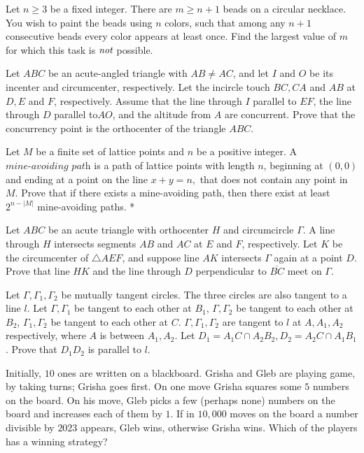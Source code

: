 \documentclass[11pt]{scrartcl}
\begin{document}
\begin{problem}[822921222405372]
Let $n\ge 3$ be a fixed integer. There are $m\ge n+1$ beads on a circular necklace. You wish to paint the beads using $n$ colors, such that among any $n+1$ consecutive beads every color appears at least once. Find the largest value of $m$ for which this task is $\emph{not}$ possible.
\end{problem}
\begin{problem}[318208660266829737]
Let $ABC$ be an acute-angled triangle with $AB \ne AC$, and let $I$ and $O$ be its incenter and circumcenter, respectively. Let the incircle touch $BC, CA$ and $AB$ at $D, E$ and $F$, respectively. Assume that the line through $I$ parallel to $EF$, the line through $D$ parallel to$ AO$, and the altitude from $A$ are concurrent. Prove that the concurrency point is the orthocenter of the triangle $ABC$.
\end{problem}
\begin{problem}[2886276736199315342]
	Let $M$ be a finite set of lattice points and $n$ be a positive integer. A $\textit{mine-avoiding path}$ is a path of lattice points with length $n$, beginning at $(0,0)$ and ending at a point on the line $x+y=n,$ that does not contain any point in $M$. Prove that if there exists a mine-avoiding path, then there exist at least $2^{n-|M|}$ mine-avoiding paths. *
\end{problem}
\begin{problem}[896600029778859256]
	Let $ABC$ be an acute triangle with orthocenter $H$ and circumcircle $\Gamma$. A line through $H$ intersects segments $AB$ and $AC$ at $E$ and $F$, respectively. Let $K$ be the circumcenter of $\triangle AEF$, and suppose line $AK$ intersects $\Gamma$ again at a point $D$. Prove that line $HK$ and the line through $D$ perpendicular to $\overline{BC}$ meet on $\Gamma$.
\end{problem}
\begin{problem}[1121095467606378762]
	Let $\Gamma, \Gamma_1, \Gamma_2$ be mutually tangent circles. The three circles are also tangent to a line $l$. Let $\Gamma, \Gamma_1$ be tangent to each other at $B_1$, $\Gamma, \Gamma_2$ be tangent to each other at $B_2$, $\Gamma_1, \Gamma_2$ be tangent to each other at $C$. $\Gamma, \Gamma_1, \Gamma_2$ are tangent to $l$ at $A, A_1, A_2$ respectively, where $A$ is between $A_1,A_2$. Let $D_1 = A_1C \cap A_2B_2, D_2 = A_2C \cap A_1B_1$. Prove that $D_1D_2$ is parallel to $l$.
\end{problem}
\begin{problem}[428632191392819]
Initially, $10$ ones are written on a blackboard. Grisha and Gleb are playing game, by taking turns; Grisha goes first. On one move Grisha squares some $5$ numbers on the board. On his move, Gleb picks a few (perhaps none) numbers on the board and increases each of them by $1$. If in $10,000$ moves on the board a number divisible by $2023$ appears, Gleb wins, otherwise Grisha wins. Which of the players has a winning strategy?
\end{problem}
\end{document}
